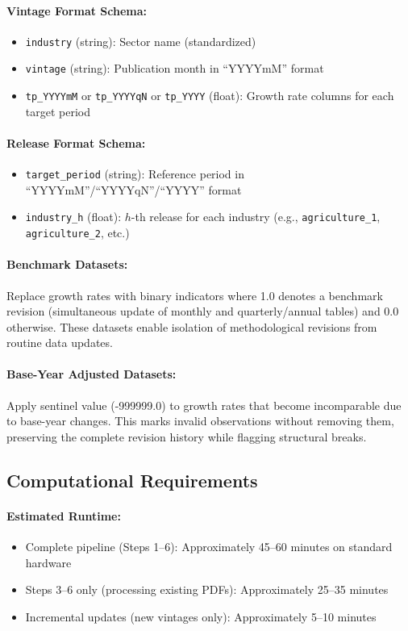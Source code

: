 \documentclass[a4paper, fleqn, 11pt]{article}
\begin{document}
\paragraph{Vintage Format Schema:}
\begin{itemize}
    \item \texttt{industry} (string): Sector name (standardized)
    \item \texttt{vintage} (string): Publication month in ``YYYYmM'' format
    \item \texttt{tp\_YYYYmM} or \texttt{tp\_YYYYqN} or \texttt{tp\_YYYY} (float): Growth rate columns for each target period
\end{itemize}

\paragraph{Release Format Schema:}
\begin{itemize}
    \item \texttt{target\_period} (string): Reference period in ``YYYYmM''/``YYYYqN''/``YYYY'' format
    \item \texttt{industry\_h} (float): $h$-th release for each industry (e.g., \texttt{agriculture\_1}, \texttt{agriculture\_2}, etc.)
\end{itemize}

\paragraph{Benchmark Datasets:}
Replace growth rates with binary indicators where 1.0 denotes a benchmark revision (simultaneous update of monthly and quarterly/annual tables) and 0.0 otherwise. These datasets enable isolation of methodological revisions from routine data updates.

\paragraph{Base-Year Adjusted Datasets:}
Apply sentinel value (-999999.0) to growth rates that become incomparable due to base-year changes. This marks invalid observations without removing them, preserving the complete revision history while flagging structural breaks.

\subsection{Computational Requirements}

\paragraph{Estimated Runtime:}
\begin{itemize}
    \item Complete pipeline (Steps 1--6): Approximately 45--60 minutes on standard hardware
    \item Steps 3--6 only (processing existing PDFs): Approximately 25--35 minutes
    \item Incremental updates (new vintages only): Approximately 5--10 minutes
\end{itemize}
\end{document}
